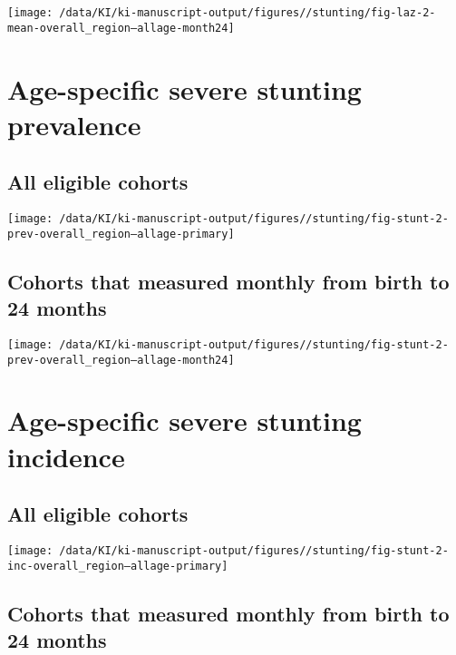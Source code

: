\documentclass[
  9pt,
]{book}
\begin{document}
\texttt{[image: /data/KI/ki-manuscript-output/figures//stunting/fig-laz-2-mean-overall\_region--allage-month24]}

\hypertarget{age-specific-severe-stunting-prevalence-1}{%
\section{Age-specific severe stunting prevalence}\label{age-specific-severe-stunting-prevalence-1}}

\hypertarget{all-eligible-cohorts-1}{%
\subsection{All eligible cohorts}\label{all-eligible-cohorts-1}}

\texttt{[image: /data/KI/ki-manuscript-output/figures//stunting/fig-stunt-2-prev-overall\_region--allage-primary]}

\hypertarget{cohorts-that-measured-monthly-from-birth-to-24-months-1}{%
\subsection{Cohorts that measured monthly from birth to 24 months}\label{cohorts-that-measured-monthly-from-birth-to-24-months-1}}

\texttt{[image: /data/KI/ki-manuscript-output/figures//stunting/fig-stunt-2-prev-overall\_region--allage-month24]}

\hypertarget{age-specific-severe-stunting-incidence-1}{%
\section{Age-specific severe stunting incidence}\label{age-specific-severe-stunting-incidence-1}}

\hypertarget{all-eligible-cohorts-2}{%
\subsection{All eligible cohorts}\label{all-eligible-cohorts-2}}

\texttt{[image: /data/KI/ki-manuscript-output/figures//stunting/fig-stunt-2-inc-overall\_region--allage-primary]}

\hypertarget{cohorts-that-measured-monthly-from-birth-to-24-months-2}{%
\subsection{Cohorts that measured monthly from birth to 24 months}\label{cohorts-that-measured-monthly-from-birth-to-24-months-2}}
\end{document}
